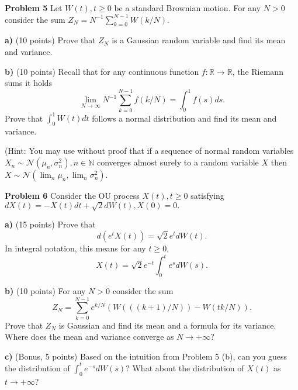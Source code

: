 \documentclass{article}
\begin{document}
\textcolor{blue}{
}


\textbf{Problem 5}   Let $W(t), t \geq 0$ be a standard Brownian motion. For any $N > 0$ consider the sum
$Z_N = N^{-1} \sum_{k=0}^{N-1} W(k/N).$

\textbf{a)}   (10 points) Prove that $Z_N$ is a Gaussian random variable and find its mean and variance.

\textcolor{blue}{
}


\textbf{b)}   (10 points) Recall that for any continuous function 
$f : \mathbb{R} \rightarrow \mathbb{R}$, the Riemann sums it holds
$$\lim_{N \rightarrow \infty} N^{-1} \sum_{k=0}^{N-1} f(k/N) = \int_0^1 f(s)ds.$$
Prove that 
$\int_0^1 W(t)dt$ 
follows a normal distribution and find its mean and variance.

(Hint: You may use without proof that if a sequence of normal random variables $X_n \sim \mathcal{N}(\mu_n, \sigma_n^2), n \in \mathbb{N}$ converges almost surely to a random variable $X$ then 
$X \sim \mathcal{N}(\lim_n \mu_n, \lim_n \sigma_n^2).$


\textcolor{blue}{
}


\textbf{Problem 6}   Consider the OU process $X(t), t \geq 0$ satisfying 
$dX(t) = -X(t)dt + \sqrt{2}dW(t),   X(0) = 0.$

\textbf{a)}   (15 points) Prove that 
$$d(e^t X(t)) = \sqrt{2}e^t dW(t).$$
In integral notation, this means for any $t \geq 0$,
$$X(t) = \sqrt{2}e^{-t} \int_0^t e^s dW(s).$$


\textcolor{blue}{
}



\textbf{b)}   (10 points) For any $N > 0$ consider the sum
$$Z_N = \sum_{k=0}^{N-1} e^{k/N}(W(((k+1)/N)) - W(tk/N)).$$
Prove that $Z_N$ is Gaussian and find its mean and a formula for its variance. Where does the mean and variance converge as $N \rightarrow +\infty$?


\textcolor{blue}{
}


\textbf{c)}   (Bonus, 5 points) Based on the intuition from Problem 5 (b), can you guess the distribution of 
$\int_0^t e^{-s} dW(s)?$ 
What about the distribution of $X(t)$ as $t \rightarrow +\infty$?

\textcolor{blue}{
}
\end{document}
